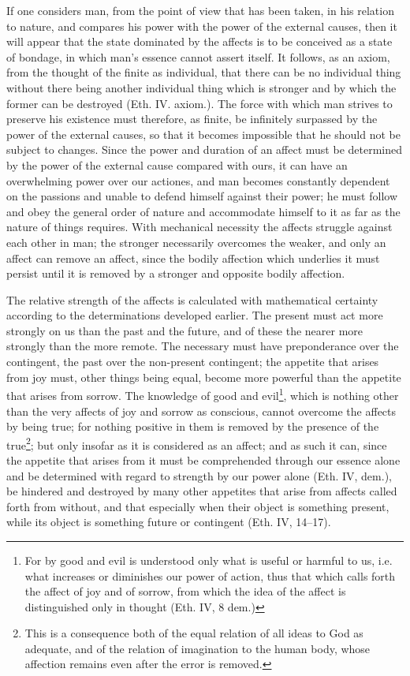 \documentclass[12pt,a4paper,openany]{book}
\newcommand{\opage}[1]{\marginnote{\footnotesize\textit{[#1]}}}
\begin{document}
If one considers man, from the point of view that has been taken,
in his relation to nature, and compares
his power with the power of the external causes, then it will
appear that the state dominated by the affects is to be conceived
as a state of bondage, in which man's essence cannot
assert itself. It follows, as an axiom, from the thought of
the finite as individual, that there can be no individual
thing without there being another individual thing which is
stronger and by which the former can be destroyed (Eth. IV.
axiom.). The force with which man strives to
\opage{120}\setcounter{footnote}{0}preserve his existence must therefore, as finite, be infinitely
surpassed by the power of the external causes, so that it becomes
impossible that he should not be subject to changes.
Since the power and duration of an affect must be determined by the
power of the external cause compared with ours, it can
have an overwhelming power over our actiones, and man
becomes constantly dependent on the passions and
unable to defend himself against their power; he must follow and
obey the general order of nature and accommodate himself to it
as far as the nature of things requires. With mechanical
necessity the affects struggle against each other in man;
the stronger necessarily overcomes the weaker, and only
an affect can remove an affect, since the bodily affection
which underlies it must persist until it is removed
by a stronger and opposite bodily affection.

The relative strength of the affects is calculated with mathematical
certainty according to the determinations developed earlier. The
present must act more strongly on us than the past
and the future, and of these the nearer more strongly than
the more remote. The necessary must have preponderance over the
contingent, the past over the non-present
contingent; the appetite that arises from joy must, other things
being equal, become more powerful than the appetite that arises from sorrow.
The knowledge of good and evil\footnote{For by good and evil is understood only what is useful or
harmful to us, i.e. what increases or diminishes our power of action,
thus that which calls forth the affect of joy and of sorrow, from which
the idea of the affect is distinguished only in thought (Eth. IV, 8 dem.)}, which is nothing other
than the very affects of joy and sorrow as conscious, cannot
overcome the affects by being true; for nothing
positive in them is removed by the presence of the true\footnote{This is a consequence both of the equal relation of all ideas to God as
adequate, and of the relation of imagination to the human body,
whose affection remains even after the error is removed.}; but
only insofar as it is considered as an affect; and as such
it can, since the appetite that arises from it must be comprehended
\opage{121}\setcounter{footnote}{0}through our essence alone and be determined with regard to strength
by our power alone (Eth. IV, dem.), be hindered and
destroyed by many other appetites that arise from affects called forth
from without, and that especially when their object
is something present, while its object is something future or
contingent (Eth. IV, 14--17).
\end{document}
